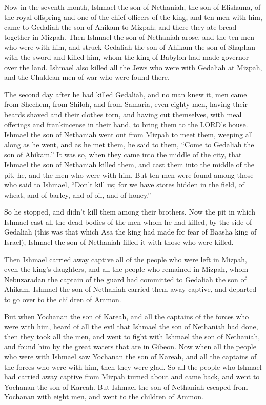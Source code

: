 \mychapter{} \myverse*{}Now in the seventh month, Ishmael the son of Nethaniah, the son of Elishama, of the royal offspring and one of the chief officers of the king, and ten men with him, came to Gedaliah the son of Ahikam to Mizpah; and there they ate bread together in Mizpah. \myverse{}Then Ishmael the son of Nethaniah arose, and the ten men who were with him, and struck Gedaliah the son of Ahikam the son of Shaphan with the sword and killed him, whom the king of Babylon had made governor over the land. \myverse{}Ishmael also killed all the Jews who were with Gedaliah at Mizpah, and the Chaldean men of war who were found there.


\myverse{}The second day after he had killed Gedaliah, and no man knew it, \myverse{}men came from Shechem, from Shiloh, and from Samaria, even eighty men, having their beards shaved and their clothes torn, and having cut themselves, with meal offerings and frankincense in their hand, to bring them to the LORD’s house. \myverse{}Ishmael the son of Nethaniah went out from Mizpah to meet them, weeping all along as he went, and as he met them, he said to them, “Come to Gedaliah the son of Ahikam.” \myverse{}It was so, when they came into the middle of the city, that Ishmael the son of Nethaniah killed them, and cast them into the middle of the pit, he, and the men who were with him. \myverse{}But ten men were found among those who said to Ishmael, “Don’t kill us; for we have stores hidden in the field, of wheat, and of barley, and of oil, and of honey.”

So he stopped, and didn’t kill them among their brothers. \myverse{}Now the pit in which Ishmael cast all the dead bodies of the men whom he had killed, by the side of Gedaliah (this was that which Asa the king had made for fear of Baasha king of Israel), Ishmael the son of Nethaniah filled it with those who were killed.


\myverse{}Then Ishmael carried away captive all of the people who were left in Mizpah, even the king’s daughters, and all the people who remained in Mizpah, whom Nebuzaradan the captain of the guard had committed to Gedaliah the son of Ahikam. Ishmael the son of Nethaniah carried them away captive, and departed to go over to the children of Ammon.


\myverse{}But when Yochanan the son of Kareah, and all the captains of the forces who were with him, heard of all the evil that Ishmael the son of Nethaniah had done, \myverse{}then they took all the men, and went to fight with Ishmael the son of Nethaniah, and found him by the great waters that are in Gibeon. \myverse{}Now when all the people who were with Ishmael saw Yochanan the son of Kareah, and all the captains of the forces who were with him, then they were glad. \myverse{}So all the people who Ishmael had carried away captive from Mizpah turned about and came back, and went to Yochanan the son of Kareah. \myverse{}But Ishmael the son of Nethaniah escaped from Yochanan with eight men, and went to the children of Ammon.


